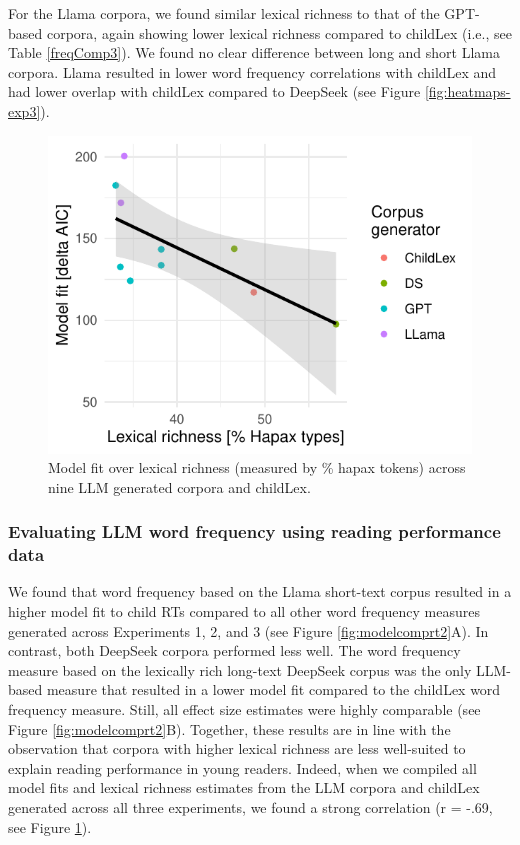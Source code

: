 \documentclass[manuscript]{stjour}
\begin{document}
For the Llama corpora, we found similar lexical richness to that of the GPT-based corpora, again showing lower lexical richness compared to childLex (i.e., see Table  \ref{freqComp3}). We found no clear difference between long and short Llama corpora. Llama resulted in lower word frequency correlations with childLex and had lower overlap with childLex compared to DeepSeek (see Figure \ref{fig:heatmaps-exp3}). 

\begin{figure}[!htbp]
  \centerline{
    \includegraphics[width=.6\textwidth]{figures/fig9_r2_cor.pdf}}
    \caption{Model fit over lexical richness (measured by \% hapax tokens) across nine LLM generated corpora and childLex. }
    \label{fig:scatterrichness}
\end{figure}


\subsubsection*{Evaluating LLM word frequency using reading performance data}

We found that word frequency based on the Llama short-text corpus resulted in a higher model fit to child RTs compared to all other word frequency measures generated across Experiments 1, 2, and 3 (see Figure \ref{fig:modelcomprt2}A). In contrast, both DeepSeek corpora performed less well. The word frequency measure based on the lexically rich long-text DeepSeek corpus was the only LLM-based measure that resulted in a lower model fit compared to the childLex word frequency measure. Still, all effect size estimates were highly comparable (see Figure \ref{fig:modelcomprt2}B). Together, these results are in line with the observation that corpora with higher lexical richness are less well-suited to explain reading performance in young readers. Indeed, when we compiled all model fits and lexical richness estimates from the LLM corpora and childLex generated across all three experiments, we found a strong correlation (r = -.69, see Figure \ref{fig:scatterrichness}). 
\end{document}
